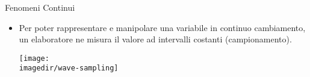 %
%
%
%
%
\setcounter{ms}{1}
\begin{slide}{Fenomeni Continui}

	\begin{itemize}

		\item Per poter rappresentare e manipolare una variabile
			in continuo cambiamento, un elaboratore ne misura
			il valore ad intervalli costanti (campionamento).

			\begin{center}
				\texttt{[image: \\imagedir/wave-sampling]}
			\end{center}

	\end{itemize}

\end{slide}
